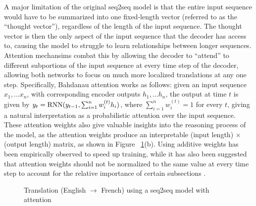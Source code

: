 \documentclass{article}
\begin{document}
A major limitation of the original seq2seq model is that the entire input sequence would have to be summarized into one fixed-length vector (referred to as the ``thought vector''), regardless of the length of the input sequence. The thought vector is then the only aspect of the input sequence that the decoder has access to, causing the model to struggle to learn relationships between longer sequences. Attention mechansims combat this by allowing the decoder to ``attend'' to different subportions of the input sequence at every time step of the decoder, allowing both networks to focus on much more localized translations at any one step. Specifically, Bahdanau attention \cite{Bahdanau} works as follows: given an input sequence $x_1, \ldots x_n$, with corresponding encoder outputs $h_1, \ldots h_n$, the output at time $t$ is given by $y_t = \textnormal{RNN}(y_{t-1}, \sum_{i=1}^n w_i^{(t)} h_i)$, where $\sum_{i=1}^n w_i^{(t)} = 1$ for every $t$, giving a natural interpretation as a probabilistic attention over the input sequence. These attention weights also give valuable insights into the reasoning process of the model, as the attention weights produce an interpretable (input length) $\times$ (output length) matrix, as shown in Figure ~\ref{fig:attention}(b). Using additive weights \cite{Luong} has been empirically observed to speed up training, while it has also been suggested that attention weights should not be normalized to the same value at every time step to account for the relative importance of certain subsections \cite{Nallapati}. 

\begin{figure}[h]
	\centering
	\qquad
	\caption{Translation (English $\rightarrow$ French) using a seq2seq model with attention}
	\label{fig:attention}
\end{figure}
\end{document}
